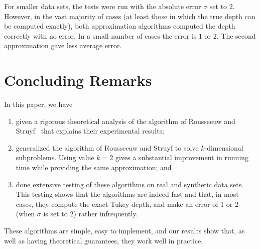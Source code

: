 \documentclass[preprint, 12pt]{elsarticle}
\begin{document}
For smaller data sets, the tests were run with the absolute error $\sigma$ set to $2$. However, in the vast majority of cases (at least those in which the true depth can be computed exactly), both approximation algorithms computed the depth correctly with no error. In a small number of cases the error is $1$ or $2$. The second approximation gave less average error.

\section{Concluding Remarks}
\label{sec:cld}

In this paper, we have
\begin{enumerate}
\item given a rigorous theoretical analysis of the algorithm of Rousseeuw and Struyf~\cite{Rousseeuw98} that explains their experimental results;
\item generalized the algorithm of Rousseeuw and Struyf to solve $k$-dimensional subproblems. Using value $k = 2$ gives a substantial improvement in running time while providing the same approximation; and
\item done extensive testing of these algorithms on real and synthetic data sets. This testing shows that the algorithms are indeed fast and that, in most cases, they compute the exact Tukey depth, and make an error of $1$ or $2$ (when $\sigma$ is set to $2$) rather infrequently.
\end{enumerate}

These algorithms are simple, easy to implement, and our results show that, as well as having theoretical guarantees, they work well in practice.



\end{document}
